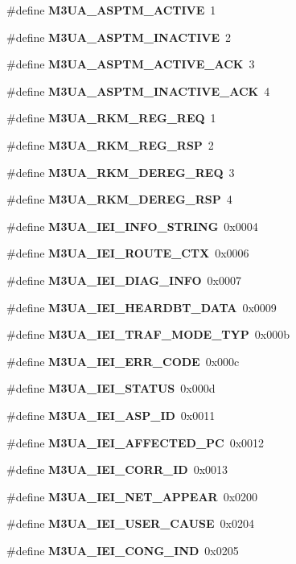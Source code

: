 \begin{DoxyCompactItemize}
\item 
\#define {\bf M3\+U\+A\+\_\+\+A\+S\+P\+T\+M\+\_\+\+A\+C\+T\+I\+VE}~1
\item 
\#define {\bf M3\+U\+A\+\_\+\+A\+S\+P\+T\+M\+\_\+\+I\+N\+A\+C\+T\+I\+VE}~2
\item 
\#define {\bf M3\+U\+A\+\_\+\+A\+S\+P\+T\+M\+\_\+\+A\+C\+T\+I\+V\+E\+\_\+\+A\+CK}~3
\item 
\#define {\bf M3\+U\+A\+\_\+\+A\+S\+P\+T\+M\+\_\+\+I\+N\+A\+C\+T\+I\+V\+E\+\_\+\+A\+CK}~4
\item 
\#define {\bf M3\+U\+A\+\_\+\+R\+K\+M\+\_\+\+R\+E\+G\+\_\+\+R\+EQ}~1
\item 
\#define {\bf M3\+U\+A\+\_\+\+R\+K\+M\+\_\+\+R\+E\+G\+\_\+\+R\+SP}~2
\item 
\#define {\bf M3\+U\+A\+\_\+\+R\+K\+M\+\_\+\+D\+E\+R\+E\+G\+\_\+\+R\+EQ}~3
\item 
\#define {\bf M3\+U\+A\+\_\+\+R\+K\+M\+\_\+\+D\+E\+R\+E\+G\+\_\+\+R\+SP}~4
\item 
\#define {\bf M3\+U\+A\+\_\+\+I\+E\+I\+\_\+\+I\+N\+F\+O\+\_\+\+S\+T\+R\+I\+NG}~0x0004
\item 
\#define {\bf M3\+U\+A\+\_\+\+I\+E\+I\+\_\+\+R\+O\+U\+T\+E\+\_\+\+C\+TX}~0x0006
\item 
\#define {\bf M3\+U\+A\+\_\+\+I\+E\+I\+\_\+\+D\+I\+A\+G\+\_\+\+I\+N\+FO}~0x0007
\item 
\#define {\bf M3\+U\+A\+\_\+\+I\+E\+I\+\_\+\+H\+E\+A\+R\+D\+B\+T\+\_\+\+D\+A\+TA}~0x0009
\item 
\#define {\bf M3\+U\+A\+\_\+\+I\+E\+I\+\_\+\+T\+R\+A\+F\+\_\+\+M\+O\+D\+E\+\_\+\+T\+YP}~0x000b
\item 
\#define {\bf M3\+U\+A\+\_\+\+I\+E\+I\+\_\+\+E\+R\+R\+\_\+\+C\+O\+DE}~0x000c
\item 
\#define {\bf M3\+U\+A\+\_\+\+I\+E\+I\+\_\+\+S\+T\+A\+T\+US}~0x000d
\item 
\#define {\bf M3\+U\+A\+\_\+\+I\+E\+I\+\_\+\+A\+S\+P\+\_\+\+ID}~0x0011
\item 
\#define {\bf M3\+U\+A\+\_\+\+I\+E\+I\+\_\+\+A\+F\+F\+E\+C\+T\+E\+D\+\_\+\+PC}~0x0012
\item 
\#define {\bf M3\+U\+A\+\_\+\+I\+E\+I\+\_\+\+C\+O\+R\+R\+\_\+\+ID}~0x0013
\item 
\#define {\bf M3\+U\+A\+\_\+\+I\+E\+I\+\_\+\+N\+E\+T\+\_\+\+A\+P\+P\+E\+AR}~0x0200
\item 
\#define {\bf M3\+U\+A\+\_\+\+I\+E\+I\+\_\+\+U\+S\+E\+R\+\_\+\+C\+A\+U\+SE}~0x0204
\item 
\#define {\bf M3\+U\+A\+\_\+\+I\+E\+I\+\_\+\+C\+O\+N\+G\+\_\+\+I\+ND}~0x0205

\end{DoxyCompactItemize}
